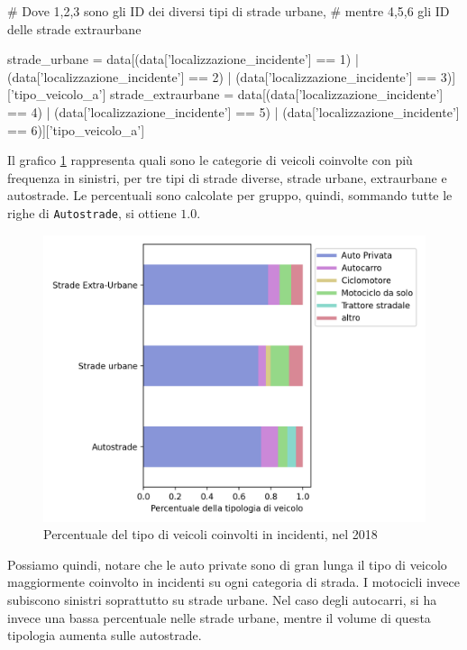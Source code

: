 \documentclass[a4paper]{report}
\newcommand{\columnstyle}[1]{\texttt{#1}}
\begin{document}
\begin{code}[language=Python]
# Dove 1,2,3 sono gli ID dei diversi tipi di strade urbane, 
# mentre 4,5,6 gli ID delle strade extraurbane

strade_urbane = data[(data['localizzazione_incidente'] == 1) | (data['localizzazione_incidente'] == 2) | (data['localizzazione_incidente'] == 3)]['tipo_veicolo_a']
strade_extraurbane = data[(data['localizzazione_incidente'] == 4) | (data['localizzazione_incidente'] == 5) | (data['localizzazione_incidente'] == 6)]['tipo_veicolo_a']
\end{code}

Il grafico \ref{fig:differenza-strade} rappresenta quali sono le categorie di veicoli 
coinvolte con più frequenza in sinistri, per tre tipi di strade diverse, strade urbane, 
extraurbane e autostrade. 
Le percentuali sono calcolate per gruppo, quindi, sommando 
tutte le righe di \columnstyle{Autostrade}, si ottiene $1.0$. 

\begin{figure}
    \includegraphics[width=\linewidth]{../src/incidenti/incidenti_senza_coords/tipo_veicoli/differenza_strade.png}
    \caption{Percentuale del tipo di veicoli coinvolti in incidenti, nel 2018}
    \label{fig:differenza-strade}
\end{figure}

Possiamo quindi, notare che le auto private sono di gran lunga il tipo di veicolo 
maggiormente coinvolto in incidenti su ogni categoria di strada. 
I motocicli invece subiscono sinistri soprattutto su strade urbane.
Nel caso degli autocarri, si ha invece una bassa percentuale nelle strade 
urbane, mentre il volume di questa tipologia aumenta sulle autostrade. 
\end{document}
